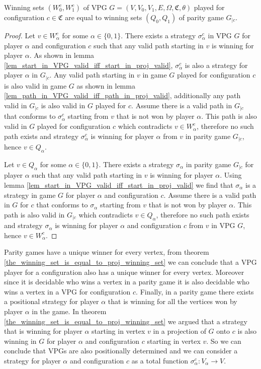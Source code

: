 \begin{theorem}
	\label{the_winning_set_is_equal_to_proj_winning_set}
	Winning sets $(W_0^c, W_1^c)$ of VPG $G = (V,V_0,V_1,E,\Omega,\mathfrak{C},\theta)$ played for configuration $c \in \mathfrak{C}$ are equal to winning sets $(Q_0,Q_1)$ of parity game $G_{|c}$.
	\begin{proof}
		Let $v \in W_\alpha^c$ for some $\alpha \in \{0,1\}$. There exists a strategy $\sigma_\alpha^c$ in VPG $G$ for player $\alpha$ and configuration $c$ such that any valid path starting in $v$ is winning for player $\alpha$. As shown in lemma \ref{lem_start_in_VPG_valid_iff_start_in_proj_valid}, $\sigma_\alpha^c$ is also a strategy for player $\alpha$ in $G_{|c}$. Any valid path starting in $v$ in game $G$ played for configuration $c$ is also valid in game $G$ as shown in lemma \ref{lem_path_in_VPG_valid_iff_path_in_proj_valid}, additionally any path valid in $G_{|c}$ is also valid in $G$ played for $c$. Assume there is a valid path in $G_{|c}$ that conforms to $\sigma_\alpha^c$ starting from $v$ that is not won by player $\alpha$. This path is also valid in $G$ played for configuration $c$ which contradicts $v \in W_\alpha^c$, therefore no such path exists and strategy $\sigma_\alpha^c$ is winning for player $\alpha$ from $v$ in parity game $G_{|c}$, hence $v \in Q_\alpha$.
		
		Let $v \in Q_\alpha$ for some $\alpha \in \{0,1\}$. There exists a strategy $\sigma_\alpha$ in parity game $G_{|c}$ for player $\alpha$ such that any valid path starting in $v$ is winning for player $\alpha$. Using lemma \ref{lem_start_in_VPG_valid_iff_start_in_proj_valid} we find that $\sigma_\alpha$ is a strategy in game $G$ for player $\alpha$ and configuration $c$. Assume there is a valid path in $G$ for $c$ that conforms to $\sigma_\alpha$ starting from $v$ that is not won by player $\alpha$. This path is also valid in $G_{|c}$ which contradicts $v \in Q_\alpha$, therefore no such path exists and strategy $\sigma_\alpha$ is winning for player $\alpha$ and configuration $c$ from $v$ in VPG $G$, hence $v \in W_\alpha^c$.
	\end{proof}
\end{theorem}

Parity games have a unique winner for every vertex, from theorem \ref{the_winning_set_is_equal_to_proj_winning_set} we can conclude that a VPG player for a configuration also has a unique winner for every vertex. Moreover since it is decidable who wins a vertex in a parity game it is also decidable who wins a vertex in a VPG for configuration $c$. Finally, in a parity game there exists a positional strategy for player $\alpha$ that is winning for all the vertices won by player $\alpha$ in the game. In theorem \ref{the_winning_set_is_equal_to_proj_winning_set} we argued that a strategy that is winning for player $\alpha$ starting in vertex $v$ in a projection of $G$ onto $c$ is also winning in $G$ for player $\alpha$ and configuration $c$ starting in vertex $v$. So we can conclude that VPGs are also positionally determined and we can consider a strategy for player $\alpha$ and configuration $c$ as a total function $\sigma_\alpha^c : V_\alpha \rightarrow V$.

